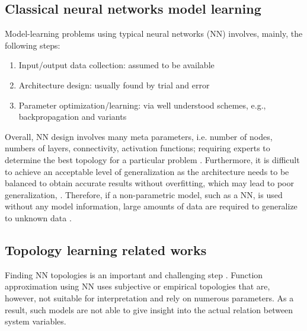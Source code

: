 \subsection{Classical neural networks model learning}
Model-learning problems using typical neural networks (NN) involves, mainly, the following steps:
\begin{enumerate}
\item Input/output data collection: assumed to be available
\item Architecture design: usually found by trial and error
\item Parameter optimization/learning: via well understood schemes, e.g., backpropagation and variants
\end{enumerate}
Overall, NN design involves many meta parameters, i.e. number of nodes, numbers of layers, connectivity, activation functions; requiring experts to determine the best topology for a particular problem \cite{Matteucci2006}. Furthermore, it is difficult to achieve an acceptable level of generalization \cite{RochaCorNev2005}\cite{He2015}\cite{Matteucci2006}\cite{KwokYeu1995}\cite{LawrenceGilTso1998}\cite{TalebiAbdPatKho2010} as the architecture needs to be balanced to obtain accurate results without overfitting, which may lead to poor generalization, \cite{He2015}\cite{MuzhouLee2013}\cite{TalebiAbdPatKho2010}. Therefore, if a non-parametric model, such as a NN, is used without any model information, large amounts of data are required to generalize to unknown data \cite{UrolaginPreRed2012}.

\subsection{Topology learning related works}
Finding NN topologies is an important and challenging step \cite{MiikkulainenLiaMeyRaw2017}\cite{RochaCorNev2005}\cite{BakerGupNaiRas2016}. Function approximation using NN uses subjective or empirical topologies that are, however, not suitable for interpretation and rely on numerous parameters. As a result, such models are not able to give insight into the actual relation between system variables. 

